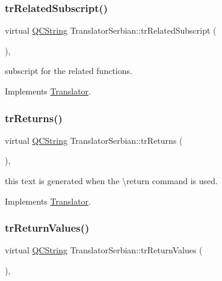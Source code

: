 \subsubsection{\texorpdfstring{trRelatedSubscript()}{trRelatedSubscript()}}
{\footnotesize\ttfamily virtual \mbox{\hyperlink{class_q_c_string}{Q\+C\+String}} Translator\+Serbian\+::tr\+Related\+Subscript (\begin{DoxyParamCaption}{ }\end{DoxyParamCaption})\hspace{0.3cm}{\ttfamily [inline]}, {\ttfamily [virtual]}}

subscript for the related functions. 

Implements \mbox{\hyperlink{class_translator}{Translator}}.

\mbox{\label{class_translator_serbian_a034fed8c32064931657c05ab80944490}} 
\subsubsection{\texorpdfstring{trReturns()}{trReturns()}}
{\footnotesize\ttfamily virtual \mbox{\hyperlink{class_q_c_string}{Q\+C\+String}} Translator\+Serbian\+::tr\+Returns (\begin{DoxyParamCaption}{ }\end{DoxyParamCaption})\hspace{0.3cm}{\ttfamily [inline]}, {\ttfamily [virtual]}}

this text is generated when the \textbackslash{}return command is used. 

Implements \mbox{\hyperlink{class_translator}{Translator}}.

\mbox{\label{class_translator_serbian_aff541c37d8ddcf6b30eb21ea2e4c7ff5}} 
\subsubsection{\texorpdfstring{trReturnValues()}{trReturnValues()}}
{\footnotesize\ttfamily virtual \mbox{\hyperlink{class_q_c_string}{Q\+C\+String}} Translator\+Serbian\+::tr\+Return\+Values (\begin{DoxyParamCaption}{ }\end{DoxyParamCaption})\hspace{0.3cm}{\ttfamily [inline]}, {\ttfamily [virtual]}}


